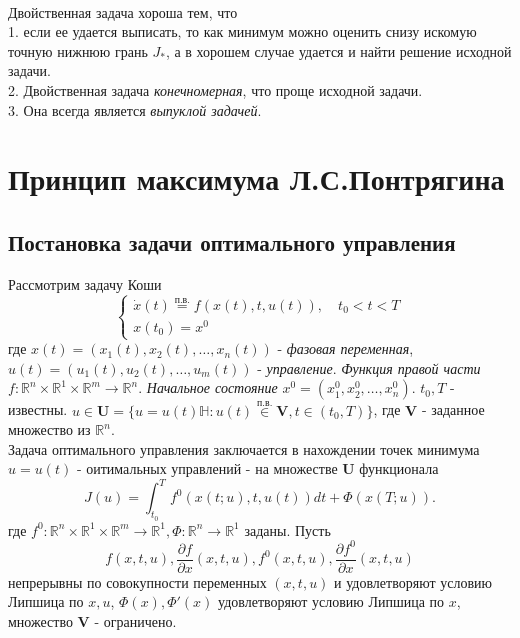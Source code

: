 \documentclass[A4]{article}
\begin{document}
\\
Двойственная задача хороша тем, что\\
1. если ее удается выписать, то как минимум можно оценить снизу искомую точную нижнюю грань $J_*$, а в хорошем случае удается и найти решение исходной задачи.\\
2. Двойственная задача \emph{конечномерная}, что проще исходной задачи.\\
3. Она всегда является \emph{выпуклой задачей}.
\section{Принцип максимума Л.С.Понтрягина}
\subsection{Постановка задачи оптимального управления}
Рассмотрим задачу Коши
\begin{equation*}
\left\{\begin{array}{l}
\dot{x}(t)\stackrel{\text{п.в.}}{=}f(x(t),t,u(t)),\quad t_0<t<T\\
x(t_0)=x^0
\end{array}\right. 
\end{equation*}
где $x(t)=(x_1(t),x_2(t),\ldots,x_n(t))$ - \emph{фазовая переменная}, $u(t)=(u_1(t),u_2(t),\ldots,u_m(t))$ - \emph{управление}. \emph{Функция правой части} $f:\mathbb{R}^n\times\mathbb{R}^1\times\mathbb{R}^m\rightarrow\mathbb{R}^n$. \emph{Начальное состояние} $x^0=(x_1^0,x_2^0,\ldots,x_n^0)$. $t_0,T$ - известны. $u\in\mathbf{U}=\{u=u(t)\mathbb{H}:u(t)\stackrel{\text{п.в.}}{\in}\mathbf{V},t\in (t_0,T) \}$, где $\mathbf{V}$ - заданное множество из $\mathbb{R}^n$.\\
Задача оптимального управления заключается в нахождении точек минимума $u=u(t)$ - оитимальных управлений - на множестве $\mathbf{U}$ функционала
\begin{equation*}
J(u)=\int_{t_0}^{T}f^0(x(t;u),t,u(t))dt+\Phi(x(T;u)).
\end{equation*}
где $f^0:\mathbb{R}^n\times\mathbb{R}^1\times\mathbb{R}^m\rightarrow\mathbb{R}^1,\Phi:\mathbb{R}^n\rightarrow \mathbb{R}^1$ заданы. Пусть 
\begin{equation*}
f(x,t,u),\frac{\partial f}{\partial x}(x,t,u),f^0(x,t,u),\frac{\partial f^0}{\partial x}(x,t,u)
\end{equation*}
непрерывны по совокупности переменных $(x,t,u)$ и удовлетворяют условию Липшица по $x,u$, $\Phi(x),\Phi'(x)$ удовлетворяют условию Липшица по $x$, множество $\mathbf{V}$ - ограничено.
\end{document}

